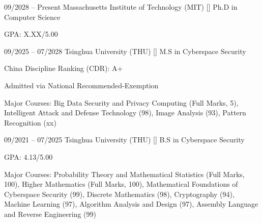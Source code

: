 \begin{resumeSubEvent}
  {09/2028 -- Present}
  {Massachusetts Institute of Technology (MIT) [\href{https://www.example.com}{\faUniversity}]}
  {Ph.D in Computer Science}
  {%
  \begin{resumeItemList}
    \item GPA: X.XX/5.00
  \end{resumeItemList}
  }%
\end{resumeSubEvent}

\begin{resumeSubEvent}
  {09/2025 -- 07/2028}
  {Tsinghua University (THU) [\href{https://www.example.com}{\faUniversity}]}
  {M.S in Cyberspace Security}
  {%
  \begin{resumeItemList}
    \item China Discipline Ranking (CDR): A+
    \item Admitted via National Recommended-Exemption
    \item Major Courses: Big Data Security and Privacy Computing (Full Marks, 5), Intelligent Attack and Defense Technology (98), Image Analysis (93), Pattern Recognition (xx)
  \end{resumeItemList}
  }%
\end{resumeSubEvent}

\begin{resumeSubEvent}
  {09/2021 -- 07/2025}
  {Tsinghua University (THU) [\href{https://www.example.com}{\faUniversity}]}
  {B.S in Cyberspace Security}
  {%
  \begin{resumeItemList}
    \item GPA: 4.13/5.00
    \item Major Courses: Probability Theory and Mathematical Statistics (Full Marks, 100), Higher Mathematics (Full Marks, 100), Mathematical Foundations of Cyberspace Security (99), Discrete Mathematics (98), Cryptography (94), Machine Learning (97), Algorithm Analysis and Design (97), Assembly Language and Reverse Engineering (99)
  \end{resumeItemList}
  }%
\end{resumeSubEvent}